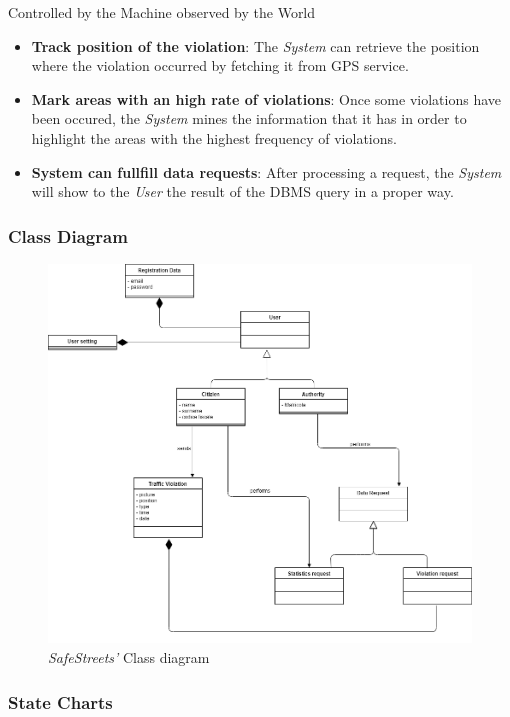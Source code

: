 \documentclass{article}
\begin{document}
Controlled by the Machine observed by the World
\begin{itemize}
    \item \textbf{Track position of the violation}:
    The \textit{System} can retrieve the position where the violation occurred by fetching it from GPS service.
    \item \textbf{Mark areas with an high rate of violations}:
    Once some violations have been occured, the \textit{System} mines the information that it has in 
    order to highlight the areas with the highest frequency of violations.
    \item\textbf{System can fullfill data requests}:
    After processing a request, the \textit{System} will show to the \textit{User} the result of the 
    DBMS query in a proper way.
\end{itemize}

\subsubsection{Class Diagram} 

\begin{figure}[h!]
    \centering
    \includegraphics[scale=0.3]{img/class_diagram.png}
    \caption{\textit{SafeStreets'} Class diagram}
\end{figure}
\clearpage
\subsubsection{State Charts} 
\end{document}
